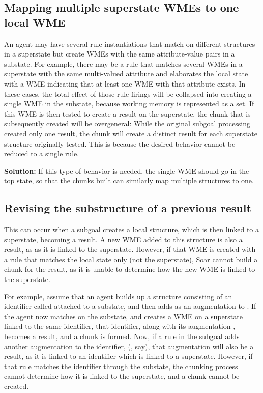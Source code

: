 \subsection{Mapping multiple superstate WMEs to one local WME}

An agent may have several rule instantiations that match on different
structures in a superstate but create WMEs with the same attribute-value pairs
in a substate. For example, there may be a rule that matches several WMEs in a
superstate with the same multi-valued attribute and elaborates the local state
with a WME indicating that at least one WME with that attribute exists.  In
these cases, the total effect of those rule firings will be collapsed into
creating a single WME in the substate, because working memory is represented as
a set.  If this WME is then tested to create a result on the superstate, the
chunk that is subsequently created will be overgeneral: While the original
subgoal processing created only one result, the chunk will create a distinct
result for each superstate structure originally tested. This is because the
desired behavior cannot be reduced to a single rule.

\textbf{Solution:} If this type of behavior is needed, the single WME should go
in the top state, so that the chunks built can similarly map multiple
structures to one.

\subsection{Revising the substructure of a previous result}

This can occur when a subgoal creates a local structure, which is then linked to a
superstate, becoming a result. A new WME added to this structure is also a result, as
as it is linked to the superstate. However, if that WME is created
with a rule that matches the local state only (not the superstate), Soar cannot build a chunk for the
result, as it is unable to determine how the new WME is linked to the
superstate.

For example, assume that an agent builds up a structure consisting of an identifier called  attached to a substate, and then adds
 as an augmentation to . If the agent now matches  on the substate, and creates a WME on a
superstate linked to the same identifier, that identifier, along with its augmentation , becomes a result, and a chunk is formed.
Now, if a rule in the subgoal adds another augmentation to the  identifier, (, say), that augmentation will also be 
a result, as it is linked to an identifier which is linked to a superstate. However, if that rule matches the identifier through the substate, the chunking
process cannot determine how it is linked to the superstate, and a chunk cannot be created.


